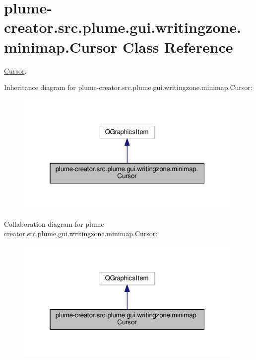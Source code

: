 \hypertarget{classplume-creator_1_1src_1_1plume_1_1gui_1_1writingzone_1_1minimap_1_1_cursor}{}\section{plume-\/creator.src.\+plume.\+gui.\+writingzone.\+minimap.\+Cursor Class Reference}
\label{classplume-creator_1_1src_1_1plume_1_1gui_1_1writingzone_1_1minimap_1_1_cursor}


\hyperlink{classplume-creator_1_1src_1_1plume_1_1gui_1_1writingzone_1_1minimap_1_1_cursor}{Cursor}.  




Inheritance diagram for plume-\/creator.src.\+plume.\+gui.\+writingzone.\+minimap.\+Cursor\+:\nopagebreak
\begin{figure}[H]
\begin{center}
\leavevmode
\includegraphics[width=313pt]{classplume-creator_1_1src_1_1plume_1_1gui_1_1writingzone_1_1minimap_1_1_cursor__inherit__graph}
\end{center}
\end{figure}


Collaboration diagram for plume-\/creator.src.\+plume.\+gui.\+writingzone.\+minimap.\+Cursor\+:\nopagebreak
\begin{figure}[H]
\begin{center}
\leavevmode
\includegraphics[width=313pt]{classplume-creator_1_1src_1_1plume_1_1gui_1_1writingzone_1_1minimap_1_1_cursor__coll__graph}
\end{center}
\end{figure}

